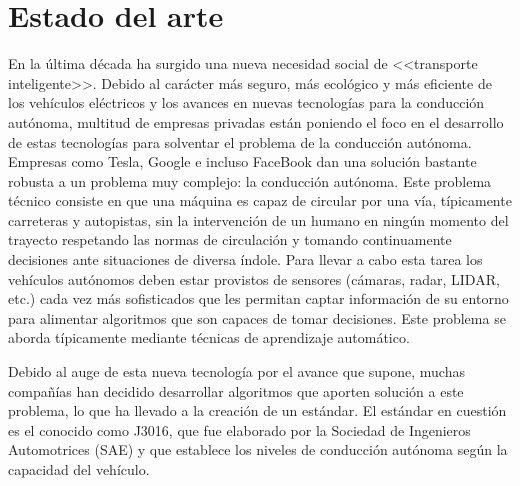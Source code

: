 \chapter{Estado del arte}

En la última década ha surgido una nueva necesidad social de <<transporte inteligente>>. Debido al carácter más seguro, más ecológico y más eficiente de los vehículos eléctricos y los avances en nuevas tecnologías para la conducción autónoma, multitud de empresas privadas están poniendo el foco en el desarrollo de estas tecnologías para solventar el problema de la conducción autónoma.
Empresas como Tesla, Google e incluso FaceBook dan una solución bastante robusta a un problema muy complejo: la conducción autónoma. Este problema técnico consiste en que una máquina es capaz de circular por una vía, típicamente carreteras y autopistas, sin la intervención de un humano en ningún momento del trayecto respetando las normas de circulación y tomando continuamente decisiones ante situaciones de diversa índole. Para llevar a cabo esta tarea los vehículos autónomos deben estar provistos de sensores (cámaras, radar, LIDAR, etc.) cada vez más sofisticados que les permitan captar información de su entorno para alimentar algoritmos que son capaces de tomar decisiones. Este problema se aborda típicamente mediante técnicas de aprendizaje automático.

Debido al auge de esta nueva tecnología por el avance que supone, muchas compañías han decidido desarrollar algoritmos que aporten solución a este problema, lo que ha llevado a la creación de un estándar. El estándar en cuestión es el conocido como J3016, que fue elaborado por la Sociedad de Ingenieros Automotrices (SAE) \cite{sae} y que establece los niveles de conducción autónoma según la capacidad del vehículo.

